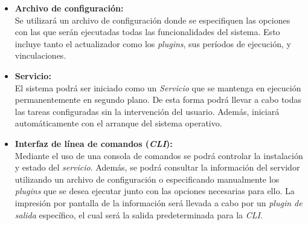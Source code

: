 \begin{itemize}
            \item \textbf{Archivo de configuración:} \\
                Se utilizará un archivo de configuración donde se especifiquen las opciones con las que serán ejecutadas todas las funcionalidades del sistema. Esto incluye tanto el actualizador como los \textit{plugins}, sus períodos de ejecución, y vinculaciones.
                
            \item \textbf{Servicio:} \\
                El sistema podrá ser iniciado como un \textit{Servicio} que se mantenga en ejecución permanentemente en segundo plano. De esta forma podrá llevar a cabo todas las tareas configuradas sin la intervención del usuario. Además, iniciará automáticamente con el arranque del sistema operativo.
                
            \item \textbf{Interfaz de línea de comandos (\textit{CLI}):} \\
                Mediante el uso de una consola de comandos se podrá controlar la instalación y estado del \textit{servicio}. Además, se podrá consultar la información del servidor utilizando un archivo de configuración o especificando manualmente los \textit{plugins} que se desea ejecutar junto con las opciones necesarias para ello. La impresión por pantalla de la información será llevada a cabo por un \textit{plugin de salida} específico, el cual será la salida predeterminada para la \textit{CLI}.
        \end{itemize}


%

    